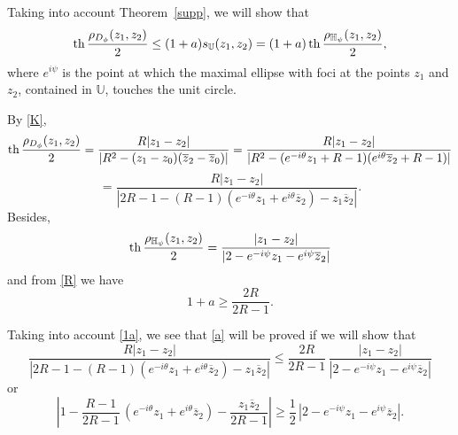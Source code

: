 \documentclass[12pt,a4paper]{amsart}
\def\th{\mathop{\rm th}\nolimits}
\begin{document}
Taking into account Theorem~\ref{supp}, we will show that
\begin{equation}\label{a}
\th\frac{\rho_{{D}_\phi}(z_1,z_2)}{2}\le (1+a)s_{\mathbb{U}}(z_1,z_2)=(1+a)\th\frac{\rho_{\mathbb{H}_\psi}(z_1,z_2)}{2},
\end{equation}
where $e^{i\psi}$ is the point at which the maximal ellipse with foci at the points $z_1$ and $z_2$, contained in $\mathbb{U}$, touches the unit circle.

By \eqref{K},
$$
\th\frac{\rho_{{D}_\phi}(z_1,z_2)}{2}=\frac{R|z_1-z_2|}{|R^2-(z_1-z_0)(\overline{z}_2-\overline{z}_0)|}=\frac{R|z_1-z_2|}{|R^2-(e^{-i\theta}z_1+R-1)(e^{i\theta}\overline{z}_2+R-1)|}$$
$$=\frac{R|z_1-z_2|}{|2R-1-(R-1)(e^{-i\theta}z_1+e^{i\theta}\overline{z}_2)-z_1\overline{z}_2|}.
$$
Besides,
$$\th\frac{\rho_{\mathbb{H}_\psi}(z_1,z_2)}{2}=\frac{|z_1-z_2|}{|2-e^{-i\psi}z_1-e^{i\psi}\overline{z}_2|}$$
and from \eqref{R} we have
\begin{equation}\label{1a}
1+a\ge\frac{2R}{2R-1}.
\end{equation}

Taking into account \eqref{1a}, we see that  \eqref{a}  will be proved if we will show that
\begin{equation}\label{2R}
\frac{R|z_1-z_2|}{|2R-1-(R-1)(e^{-i\theta}z_1+e^{i\theta}\overline{z}_2)-z_1\overline{z}_2|}\le \frac{2R}{2R-1}\,\frac{|z_1-z_2|}{|2-e^{-i\psi}z_1-e^{i\psi}\overline{z}_2|}
\end{equation}
or
\begin{equation}\label{b}
\left|1-\frac{R-1}{2R-1}\,(e^{-i\theta}z_1+e^{i\theta}\overline{z}_2)-\frac{z_1\overline{z}_2}{2R-1}\right|\ge\frac{1}{2}\,|2-e^{-i\psi}z_1-e^{i\psi}\overline{z}_2|.
\end{equation}
\end{document}
